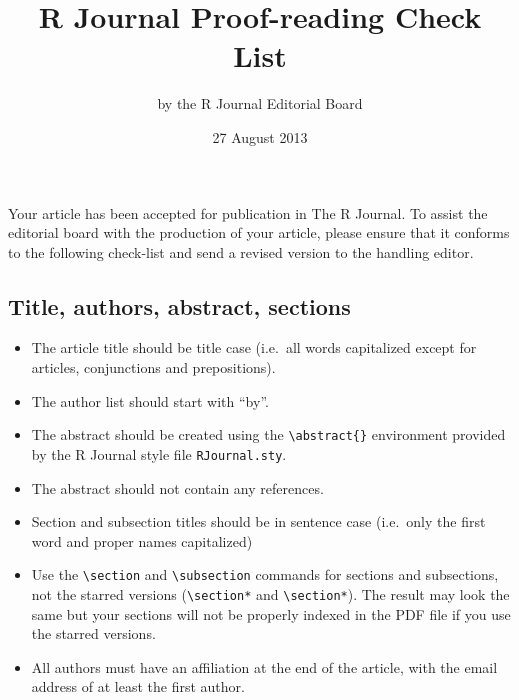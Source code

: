 \documentclass[11pt]{article}
\begin{document}
\title{R Journal Proof-reading Check List}
\author{by the R Journal Editorial Board}
\date{27 August 2013}
\maketitle

Your article has been accepted for publication in The R Journal. To
assist the editorial board with the production of your article, please
ensure that it conforms to the following check-list and send a revised
version to the handling editor.

\subsection*{Title, authors, abstract, sections}
\begin{itemize}
\item The article title should be title case (i.e.\ all words capitalized
   except for articles, conjunctions and prepositions).
\item The author list should start with ``by''.
\item The abstract should be created using the \verb+\abstract{}+
   environment provided by the R Journal style file \texttt{RJournal.sty}.
\item The abstract should not contain any references.
\item  Section and subsection titles should be in sentence case (i.e.\ only
   the first word and proper names capitalized)
\item Use the \verb+\section+ and \verb+\subsection+ commands for sections and 
      subsections, not the starred versions (\verb+\section*+
      and \verb+\section*+). The result may look the same but your
      sections will not be properly indexed in the PDF file if you use
      the starred versions.
\item All authors must have an affiliation at the end of the article,
      with the email address of at least the first author.
\end{itemize}
\end{document}
